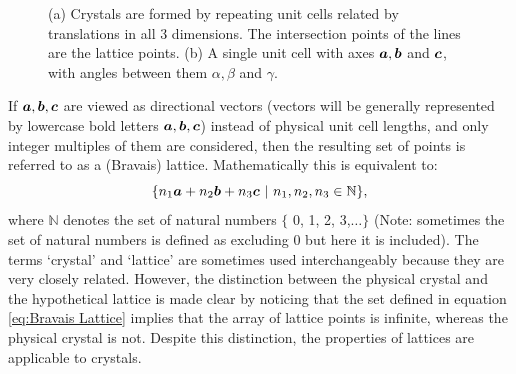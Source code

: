 \begin{figure}[H]
\begin{subfigure}[b]{0.4\textwidth}
                    \caption{}
                    \label{fig:Unit cell definition}
            \end{subfigure}
            \caption[Lattice definition.]{(a) Crystals are formed by repeating unit cells related by translations in all 3 dimensions.
            The intersection points of the lines are the lattice points.
            (b) A single unit cell with axes $\boldsymbol{a}, \boldsymbol{b}$ and $\boldsymbol{c}$, with angles between them $\alpha, \beta$ and $\gamma$. \cite{drenth2012}}
    		\label{fig:Introduction-Unit Cells}
        \end{figure}
        If $\boldsymbol{a}, \boldsymbol{b}, \boldsymbol{c}$ are viewed as directional vectors (vectors will be generally represented by lowercase bold letters {$\boldsymbol{a}, \boldsymbol{b}, \boldsymbol{c}$}) instead of physical unit cell lengths, and only integer multiples of them are considered, then the resulting set of points is referred to as a (Bravais) lattice. Mathematically this is equivalent to:
        \begin{equation}
            \{n_1 \boldsymbol{a} + n_2 \boldsymbol{b} + n_3 \boldsymbol{c}\ |\ n_1, n_2, n_3 \in \mathbb{N} \},
            \label{eq:Bravais Lattice}
        \end{equation}
        where $\mathbb{N}$ denotes the set of natural numbers $\{$ 0, 1, 2, 3,$\ldots \}$ (Note: sometimes the set of natural numbers is defined as excluding 0 but here it is included).
        The terms `crystal' and `lattice' are sometimes used interchangeably because they are very closely related.
        However, the distinction between the physical crystal and the hypothetical lattice is made clear by noticing that the set defined in equation \ref{eq:Bravais Lattice} implies that the array of lattice points is infinite, whereas the physical crystal is not.
        Despite this distinction, the properties of lattices are applicable to crystals.

